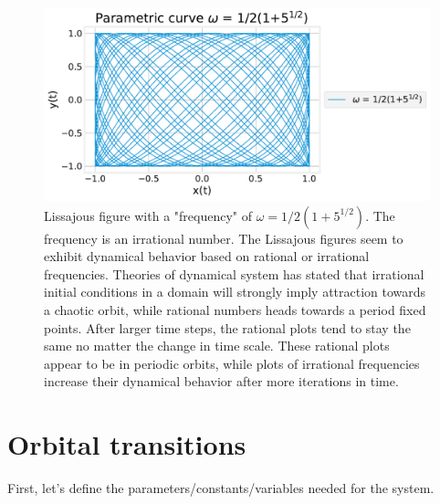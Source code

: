\documentclass[11pt]{article}
\begin{document}
\begin{figure}[H]
    \centering
    \includegraphics[width = 12 cm]{src/parametricw6.pdf}
    \caption{Lissajous figure with a "frequency" of $\omega = 1/2(1+5^{1/2})$. The frequency is an irrational number. The Lissajous figures seem to exhibit dynamical behavior based on rational or irrational frequencies. Theories of dynamical system has stated that irrational initial conditions in a domain will strongly imply attraction towards a chaotic orbit, while rational numbers heads towards a period fixed points. After larger time steps, the rational plots tend to stay the same no matter the change in time scale. These rational plots appear to be in periodic orbits, while plots of irrational frequencies increase their dynamical behavior after more iterations in time.}
    \label{fig:my_label}
\end{figure}

\clearpage


\section*{Orbital transitions}

First, let's define the parameters/constants/variables needed for the system.\\
\end{document}
